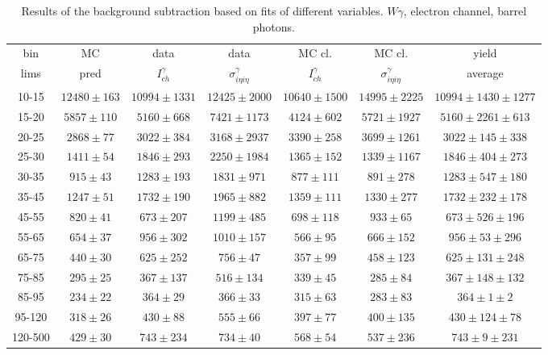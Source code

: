 \begin{table}[h]
  \tiny
  \begin{center}
  \caption{Results of the background subtraction based on fits of different variables. $W\gamma$, electron channel, barrel photons.}
  \begin{tabular}{|c|c|c|c|c|c|c|}
    bin &  MC   & data  & data  & MC cl. & MC cl. & yield \\ 
    lims & pred & $I_{ch}^{\gamma}$ & $\sigma_{i\eta i\eta}^\gamma$  & $I_{ch}^{\gamma}$  & $\sigma_{i\eta i\eta}^\gamma$   & average \\ \hline
    10-15 & $12480\pm163$ & $10994\pm1331$ & $12425\pm2000$ & $10640\pm1500$ & $14995\pm2225$ &$10994\pm1430\pm1277$  \\ \hline
    15-20 & $5857\pm110$ & $5160\pm668$ & $7421\pm1173$ & $4124\pm602$ & $5721\pm1927$ &$5160\pm2261\pm613$  \\ \hline
    20-25 & $2868\pm77$ & $3022\pm384$ & $3168\pm2937$ & $3390\pm258$ & $3699\pm1261$ &$3022\pm145\pm338$  \\ \hline
    25-30 & $1411\pm54$ & $1846\pm293$ & $2250\pm1984$ & $1365\pm152$ & $1339\pm1167$ &$1846\pm404\pm273$  \\ \hline
    30-35 & $915\pm43$ & $1283\pm193$ & $1831\pm971$ & $877\pm111$ & $891\pm278$ &$1283\pm547\pm180$  \\ \hline
    35-45 & $1247\pm51$ & $1732\pm190$ & $1965\pm882$ & $1359\pm111$ & $1330\pm277$ &$1732\pm232\pm178$  \\ \hline
    45-55 & $820\pm41$ & $673\pm207$ & $1199\pm485$ & $698\pm118$ & $933\pm65$ &$673\pm526\pm196$  \\ \hline
    55-65 & $654\pm37$ & $956\pm302$ & $1010\pm157$ & $566\pm95$ & $666\pm152$ &$956\pm53\pm296$  \\ \hline
    65-75 & $440\pm30$ & $625\pm252$ & $756\pm47$ & $357\pm99$ & $458\pm123$ &$625\pm131\pm248$  \\ \hline
    75-85 & $295\pm25$ & $367\pm137$ & $516\pm134$ & $339\pm45$ & $285\pm84$ &$367\pm148\pm132$  \\ \hline
    85-95 & $234\pm22$ & $364\pm29$ & $366\pm33$ & $315\pm63$ & $283\pm83$ &$364\pm1\pm2$  \\ \hline
    95-120 & $318\pm26$ & $430\pm88$ & $555\pm66$ & $397\pm77$ & $400\pm135$ &$430\pm124\pm78$  \\ \hline
    120-500 & $429\pm30$ & $743\pm234$ & $734\pm40$ & $568\pm54$ & $537\pm236$ &$743\pm9\pm231$  \\ \hline
  \end{tabular}
  \label{tab:diff_ways_to_fit_phoEt_BARREL_electron}
  \end{center}
\end{table}

